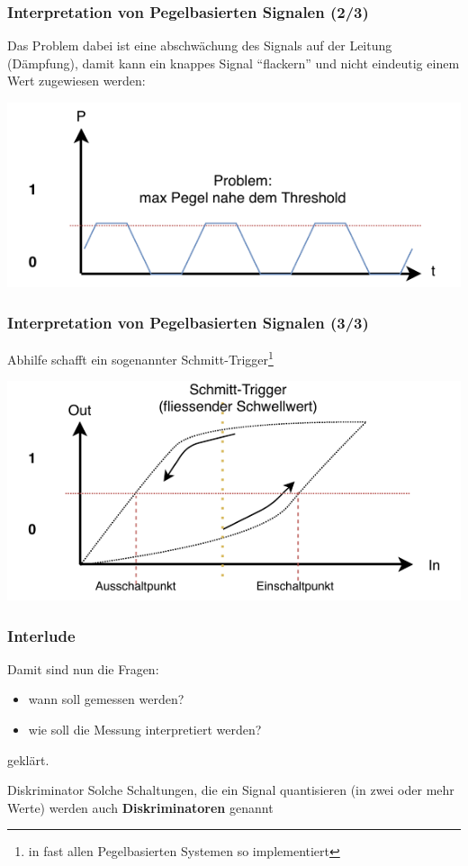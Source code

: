 \documentclass[ignorenonframetext]{beamer}
\begin{document}
\begin{frame}
\frametitle{Interpretation von Pegelbasierten Signalen (2/3)}
Das Problem dabei ist eine abschw\"achung des Signals auf der Leitung (D\"ampfung), damit kann ein knappes Signal ``flackern'' und nicht eindeutig einem Wert zugewiesen werden:

\includegraphics{threshold-soso}
\end{frame}


\begin{frame}
\frametitle{Interpretation von Pegelbasierten Signalen (3/3)}
Abhilfe schafft ein sogenannter Schmitt-Trigger\footnote{in fast allen Pegelbasierten Systemen so implementiert}

\vspace{0.5cm}

\includegraphics{schmitt-trigger}
\end{frame}



\begin{frame}
\frametitle{Interlude}
Damit sind nun die Fragen:

\begin{itemize}
  \item wann soll gemessen werden?
  \item wie soll die Messung interpretiert werden?
\end{itemize}
gekl\"art.

\begin{block}{Diskriminator}
Solche Schaltungen, die ein Signal quantisieren (in zwei oder mehr Werte) werden auch {\bfseries Diskriminatoren} genannt
\end{block}
\end{frame}
\end{document}

